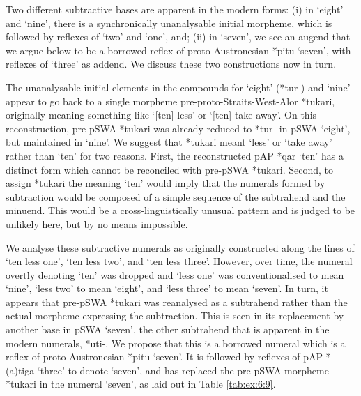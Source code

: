 \let\eachwordone=\it
\let\eachwordtwo=\rm
\let\eachwordthree=\rm
\let\eachwordfour=\rm
\let\eachwordfive=\rm
\let\eachwordsix=\rm
\let\eachwordseven=\rm


Two different subtractive bases are apparent in the modern forms: (i) in `eight' and `nine', there is a synchronically unanalysable initial morpheme, which is followed by reflexes of `two' and `one', and; (ii) in `seven', we see an augend that we argue below to be a borrowed reflex of proto-Austronesian *pitu `seven', with reflexes of `three' as addend. We discuss these two constructions now in turn.

The unanalysable initial elements in the compounds for `eight' (*tur-) and `nine' appear to go back to a single morpheme pre-proto-Straits-West-Alor *tukari, originally meaning something like `[ten] less' or `[ten] take away'. On this reconstruction, pre-pSWA *tukari was already reduced to *tur- in pSWA `eight', but maintained in `nine'. We suggest that *tukari meant `less' or `take away' rather than `ten' for two reasons. First, the reconstructed pAP *qar `ten' \citep{HoltonEtAl2012} has a distinct form which cannot be reconciled with pre-pSWA *tukari. Second, to assign *tukari the meaning `ten' would imply that the numerals formed by subtraction would be composed of a simple sequence of the subtrahend and the minuend. This would be a cross-linguistically unusual pattern and is judged to be unlikely here, but by no means impossible. 

We analyse these subtractive numerals as originally constructed along the lines of `ten less one', `ten less two', and `ten less three'. However, over time, the numeral overtly denoting `ten' was dropped and `less one' was conventionalised to mean `nine', `less two' to mean `eight', and `less three' to mean `seven'. In turn, it appears that pre-pSWA *tukari was reanalysed as a subtrahend rather than the actual morpheme expressing the subtraction. This is seen in its replacement by another base in pSWA `seven', the other subtrahend that is apparent in the modern numerals, *{\texthtb}uti-. We propose that this is a borrowed numeral which is a reflex of proto-Austronesian *pitu `seven'. It is followed by reflexes of pAP *(a)tiga `three' to denote `seven', and has replaced the pre-pSWA morpheme *tukari in the numeral `seven', as laid out in Table \ref{tab:ex:6:9}.

